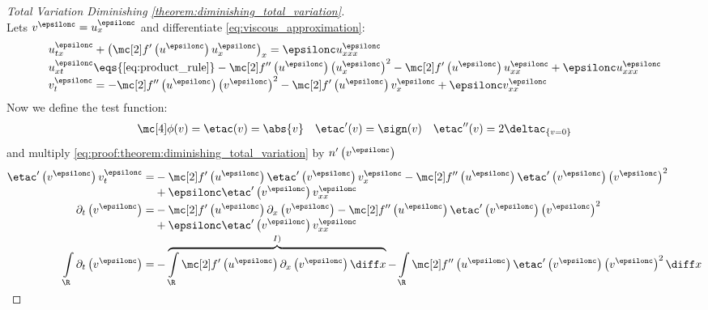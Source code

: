 \begin{proofbox}\nospacing
    \begin{proof}[Total Variation Diminishing \cref{theorem:diminishing_total_variation}]\label{proof:theorem:diminishing_total_variation}\leavevmode\\
        Lets $v^{\epsilonc}=u_{x}^{\epsilonc}$ and differentiate \cref{eq:viscous_approximation}:
        \begin{align}
          &u_{tx}^{\epsilonc}+\left(\flux' \left(u^{\epsilonc}\right)u_{x}^{\epsilonc}\right)_{x}=\epsilonc u_{xxx}^{\epsilonc}\nonumber\\[-1\jot]
          &u_{xt}^{\epsilonc}\eqs{\cref{eq:product_rule}}
            -\flux''\left(u^{\epsilonc}\right)\left(u_{x}^{\epsilonc}\right)^{2}-\flux'\left(u^{\epsilonc}\right)u_{xx}^{\epsilonc}
            +\epsilonc u_{xxx}^{\epsilonc}\nonumber\\[-1\jot]
          &v_{t}^{\epsilonc}=
            -\flux''\left(u^{\epsilonc}\right)\left(v^{\epsilonc}\right)^{2}-\flux'\left(u^{\epsilonc}\right)v_{x}^{\epsilonc}
            +\epsilonc v_{xx}^{\epsilonc}\label{eq:proof:theorem:diminishing_total_variation}
        \end{align}
        Now we define the test function:
        \begin{align*}
          \testfunc(v)=\etac(v)=\abs{v}&&\etac'(v)=\sign(v)&&\etac''(v)=2\deltac_{\{v=0\}}
        \end{align*}
        and multiply \cref{eq:proof:theorem:diminishing_total_variation} by $n'\left(v^{\epsilonc}\right)$
        \begin{align*}
          \etac'\left(v^{\epsilonc}\right) v_{t}^{\epsilonc}=&
            -\flux'\left(u^{\epsilonc}\right)\etac'\left(v^{\epsilonc}\right)v_{x}^{\epsilonc}-\flux''\left(u^{\epsilonc}\right)\etac'\left(v^{\epsilonc}\right)\left(v^{\epsilonc}\right)^{2}\\[-1\jot]
            &+\epsilonc\etac'\left(v^{\epsilonc}\right)v_{xx}^{\epsilonc}\\[-1\jot]
          \partial_{t}\left(v^{\epsilonc}\right)=&
            -\flux'\left(u^{\epsilonc}\right)\partial_{x}\left(v^{\epsilonc}\right)-\flux''\left(u^{\epsilonc}\right)\etac'\left(v^{\epsilonc}\right)\left(v^{\epsilonc}\right)^{2}\\[-1\jot]
            &+\epsilonc\etac'\left(v^{\epsilonc}\right)v_{xx}^{\epsilonc}\\[-1\jot]
          \int\limits_{\R}\partial_{t}\left(v^{\epsilonc}\right)=&
            -\overbrace{\int\limits_{\R}\flux'\left(u^{\epsilonc}\right)\partial_{x}\left(v^{\epsilonc}\right)\diff x}^{I)}-\int\limits_{\R}\flux''\left(u^{\epsilonc}\right)\etac'\left(v^{\epsilonc}\right)\left(v^{\epsilonc}\right)^{2}\diff x\\[-1\jot]

\end{align*}
\end{proof}
\end{proofbox}
